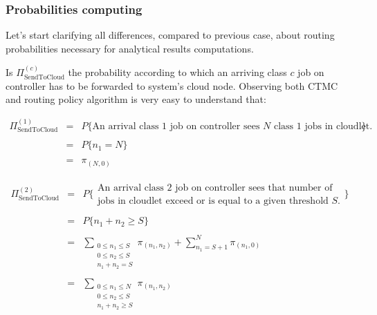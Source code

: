 \documentclass[10pt,a4paper]{article}
\begin{document}
\newpage
\subsubsection{Probabilities computing}

Let's start clarifying all differences, compared to previous case, about routing probabilities necessary for analytical results computations.

Is $\Pi_{\text{SendToCloud}}^{(c)}$ the probability according to which an arriving class $c$ job on controller has to be forwarded to system's cloud node. Observing both CTMC and routing policy algorithm is very easy to understand that:

\begin{equation}
\begin{array} {lcl} 
\Pi_{\text{SendToCloud}}^{(1)} & = & P\lbrace\text{An arrival class 1 job on controller sees $N$ class 1 jobs in cloudlet.}\rbrace \\ 
\\
& = & P\lbrace{n_1 = N}\rbrace \\ 
\\
& = & \pi_{(N,0)}
\end{array}
\end{equation}


\begin{equation}
\begin{array} {lcl} 
\Pi_{\text{SendToCloud}}^{(2)} & = & P \bigg\{ \begin{array}{l} \text{An arrival class 2 job on controller sees that number of} \\ \text{jobs in cloudlet exceed or is equal to a given threshold $S$.} \end{array} \bigg\} \\
\\
& = & P\lbrace{n_1 + n_2 \geq S}\rbrace \\ 
\\
& = & \displaystyle \sum_{\substack{0 \leq n_1 \leq S \\ 0 \leq n_2 \leq S \\ n_1 + n_2 = S}} \pi_{(n_1,n_2)} + \sum_{n_1 = S+1}^{N}\pi_{(n_1,0)} \\
\\
& = & \displaystyle \sum_{\substack{0 \leq n_1 \leq N \\ 0 \leq n_2 \leq S \\ n_1 + n_2 \geq S}} \pi_{(n_1,n_2)}\\
\end{array}
\end{equation}
\end{document}
